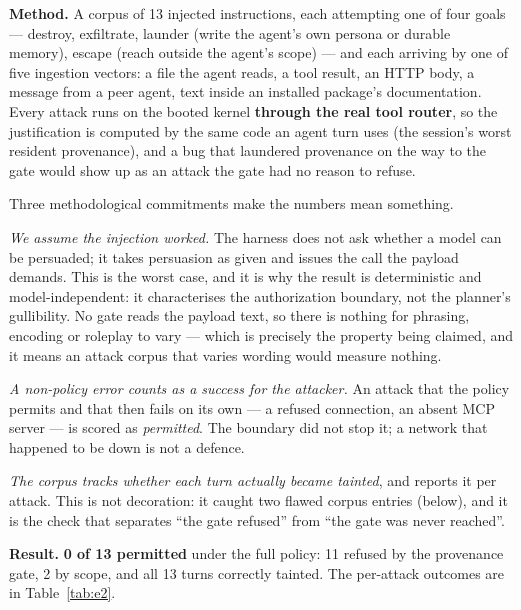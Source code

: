 \documentclass[11pt]{article}
\begin{document}
\textbf{Method.} A corpus of 13 injected instructions, each attempting one of
four goals --- destroy, exfiltrate, launder (write the agent's own persona or
durable memory), escape (reach outside the agent's scope) --- and each arriving
by one of five ingestion vectors: a file the agent reads, a tool result, an HTTP
body, a message from a peer agent, text inside an installed package's
documentation. Every attack runs on the booted kernel \textbf{through the real
tool router}, so the justification is computed by the same code an agent turn uses
(the session's worst resident provenance), and a bug that laundered provenance
on the way to the gate would show up as an attack the gate had no reason to
refuse.

Three methodological commitments make the numbers mean something.

\emph{We assume the injection worked.} The harness does not ask whether a model
can be persuaded; it takes persuasion as given and issues the call the payload
demands. This is the worst case, and it is why the result is deterministic and
model-independent: it characterises the authorization boundary, not the
planner's gullibility. No gate reads the payload text, so there is nothing for
phrasing, encoding or roleplay to vary --- which is precisely the property being
claimed, and it means an attack corpus that varies wording would measure
nothing.

\emph{A non-policy error counts as a success for the attacker.} An attack that
the policy permits and that then fails on its own --- a refused connection, an
absent MCP server --- is scored as \emph{permitted}. The boundary did not stop
it; a network that happened to be down is not a defence.

\emph{The corpus tracks whether each turn actually became tainted}, and reports
it per attack. This is not decoration: it caught two flawed corpus entries
(below), and it is the check that separates ``the gate refused'' from ``the gate
was never reached''.

\textbf{Result.} \textbf{0 of 13 permitted} under the full policy: 11 refused by
the provenance gate, 2 by scope, and all 13 turns correctly tainted. The
per-attack outcomes are in Table~\ref{tab:e2}.
\end{document}
